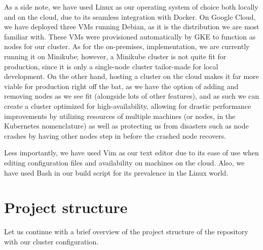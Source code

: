 \documentclass[thesis=B,english]{FITthesis}[2019/12/23]
\begin{document}
As a side note, we have used Linux as our operating system of choice both locally and on the cloud, due to its seamless integration with Docker. On Google Cloud, we have deployed three VMs running Debian, as it is the distribution we are most familiar with. These VMs were provisioned automatically by GKE to function as nodes for our cluster. As for the on-premises, implementation, we are currently running it on Minikube; however, a Minikube cluster is not quite fit for production, since it is only a single-node cluster tailor-made for local development. On the other hand, hosting a cluster on the cloud makes it far more viable for production right off the bat, as we have the option of adding and removing nodes as we see fit (alongside lots of other features), and as such we can create a cluster optimized for high-availability, allowing for drastic performance improvements by utilizing resources of multiple machines (or nodes, in the Kubernetes nomenclature) as well as protecting us from disasters such as node crashes by having other nodes step in before the crashed node recovers. \cite{high-availability}

Less importantly, we have used Vim as our text editor due to its ease of use when editing configuration files and availability on machines on the cloud. Also, we have used Bash in our build script for its prevalence in the Linux world.


\section{Project structure}

Let us continue with a brief overview of the project structure of the repository with our cluster configuration.
\end{document}

